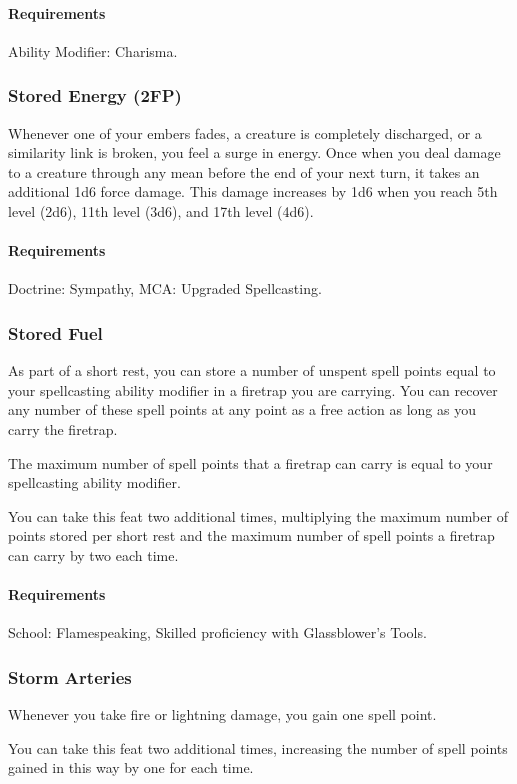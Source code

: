     \paragraph{Requirements} Ability Modifier: Charisma.
\subsubsection{Stored Energy (2FP)} \label{feat::storedenergy}
    Whenever one of your embers fades, a creature is completely discharged, or a similarity link is broken, you feel a surge in energy.
    Once when you deal damage to a creature through any mean before the end of your next turn, it takes an additional 1d6 force damage.
    This damage increases by 1d6 when you reach 5th level (2d6), 11th level (3d6), and 17th level (4d6).
    \paragraph{Requirements} Doctrine: Sympathy, MCA: Upgraded Spellcasting.
\subsubsection{Stored Fuel} \label{feat::storedfuel}
    As part of a short rest, you can store a number of unspent spell points equal to your spellcasting ability modifier in a firetrap you are carrying.
    You can recover any number of these spell points at any point as a free action as long as you carry the firetrap.

    The maximum number of spell points that a firetrap can carry is equal to your spellcasting ability modifier.

    You can take this feat two additional times, multiplying the maximum number of points stored per short rest and the maximum number of spell points a firetrap can carry by two each time.
    \paragraph{Requirements} School: Flamespeaking, Skilled proficiency with Glassblower's Tools.
\subsubsection{Storm Arteries} \label{feat::stormarteries}
    Whenever you take fire or lightning damage, you gain one spell point.

    You can take this feat two additional times, increasing the number of spell points gained in this way by one for each time.
